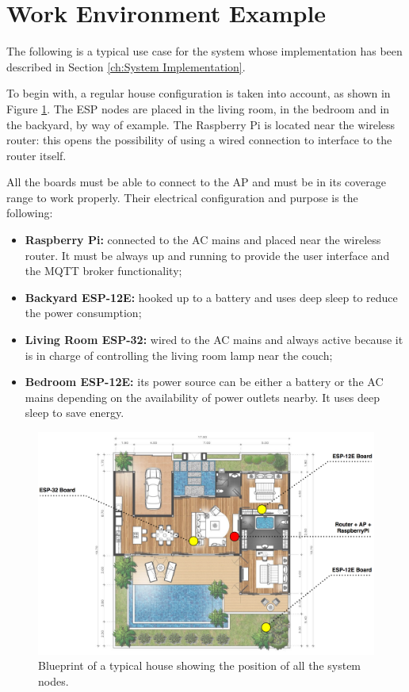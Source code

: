 \section{Work Environment Example}
The following is a typical use case for the system whose implementation has been described in Section \ref{ch:System Implementation}.

To begin with, a regular house configuration is taken into account, as shown in Figure \ref{blueprint_deployment}. The ESP nodes are placed in the living room, in the bedroom and in the backyard, by way of example. The Raspberry Pi is located near the wireless router: this opens the possibility of using a wired connection to interface to the router itself.

All the boards must be able to connect to the AP and must be in its coverage range to work properly. Their electrical configuration and purpose is the following:

\begin{itemize}
	\item \textbf{Raspberry Pi:} connected to the AC mains and placed near the wireless router. It must be always up and running to provide the user interface and the MQTT broker functionality;
	\item \textbf{Backyard ESP-12E:} hooked up to a battery and uses deep sleep to reduce the power consumption;
	\item \textbf{Living Room ESP-32:} wired to the AC mains and always active because it is in charge of controlling the living room lamp near the couch;
	\item \textbf{Bedroom ESP-12E:} its power source can be either a battery or the AC mains depending on the availability of power outlets nearby. It uses deep sleep to save energy.
\end{itemize}


\begin{figure}[H]
	\begin{center}
		\includegraphics[width=\textwidth]{./pictures/blueprint_deployment.png}
		\caption{Blueprint of a typical house showing the position of all the system nodes.}
		\label{blueprint_deployment}
	\end{center}
\end{figure}

